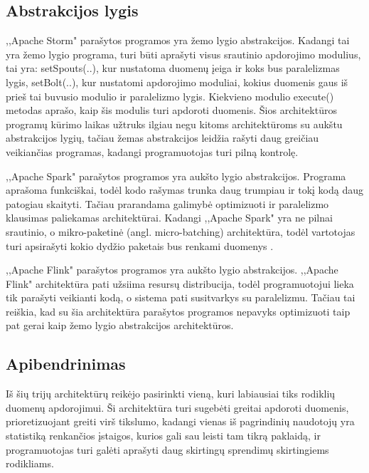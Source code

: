 \documentclass{VUMIFPSkursinis}
\begin{document}
\subsection{Abstrakcijos lygis}

,,Apache Storm" parašytos programos yra žemo lygio abstrakcijos. 
Kadangi tai yra žemo lygio programa, turi būti aprašyti visus srautinio apdorojimo modulius, 
tai yra: setSpouts(..), kur nustatoma duomenų įeiga ir koks bus paralelizmas lygis, setBolt(..), kur nustatomi apdorojimo moduliai,
kokius duomenis gaus iš prieš tai buvusio modulio ir paralelizmo lygis. Kiekvieno modulio execute() metodas aprašo, kaip šis modulis 
turi apdoroti duomenis\cite{tutpoint}. Šios architektūros programų kūrimo laikas užtruks ilgiau negu kitoms architektūroms su aukštu abstrakcijos lygių,
tačiau žemas abstrakcijos leidžia rašyti daug greičiau veikiančias programas, kadangi programuotojas turi pilną kontrolę.

,,Apache Spark" parašytos programos yra aukšto lygio abstrakcijos. 
Programa aprašoma funkciškai, todėl kodo rašymas trunka daug trumpiau ir tokį kodą daug patogiau skaityti. Tačiau prarandama galimybė optimizuoti
ir paralelizmo klausimas paliekamas architektūrai. Kadangi ,,Apache Spark" yra ne pilnai srautinio, o mikro-paketinė (angl. micro-batching) 
architektūra, todėl vartotojas turi apsirašyti kokio dydžio paketais bus renkami duomenys \cite{shoro2015big}.

,,Apache Flink" parašytos programos yra aukšto lygio abstrakcijos. ,,Apache Flink" 
architektūra pati užsiima resursų distribucija, todėl programuotojui lieka tik parašyti veikianti kodą, o sistema pati susitvarkys su paralelizmu\cite{flinkdoc}. Tačiau 
tai reiškia, kad su šia architektūra parašytos programos nepavyks optimizuoti taip pat gerai kaip žemo lygio abstrakcijos architektūros.

\subsection{Apibendrinimas}
Iš šių trijų architektūrų reikėjo pasirinkti vieną, kuri labiausiai tiks rodiklių duomenų apdorojimui. Ši architektūra turi sugebėti greitai apdoroti duomenis,
prioretizuojant greiti virš tikslumo, kadangi vienas iš pagrindinių naudotojų yra statistiką renkančios įstaigos, kurios gali sau leisti tam tikrą paklaidą,
ir programuotojas turi galėti aprašyti daug skirtingų sprendimų skirtingiems rodikliams.\par
\end{document}
